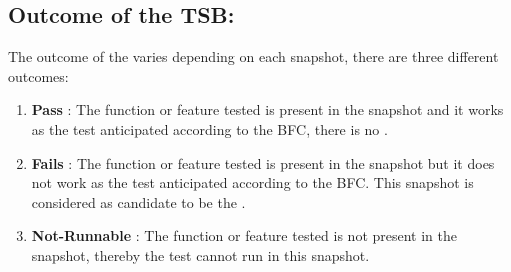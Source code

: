 \documentclass[a4paper, 12pt]{book}
\begin{document}



\subsection{Outcome of the TSB:}
The outcome of the \TSB varies depending on each snapshot, there are three different outcomes:
\begin{enumerate}
	\item {\textbf{Pass}} : The function or feature tested is present in the snapshot and it works as the test anticipated according to the BFC, there is no \BIC.
	\item {\textbf{Fails}} : The function or feature tested is present in the snapshot but it does not work as the test anticipated according to the BFC. This snapshot is considered as candidate to be the \BIC.
	\item {\textbf{Not-Runnable}} : The function or feature tested is not present in the snapshot, thereby the test cannot run in this snapshot. 
\end{enumerate}
\end{document}
